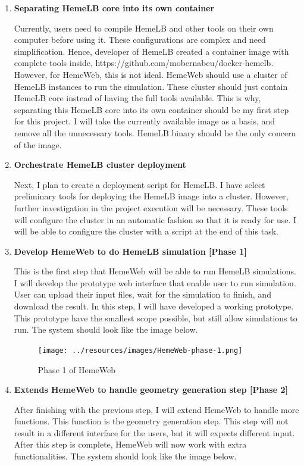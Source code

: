 \documentclass[]{article}
\begin{document}
\begin{enumerate}
\def\labelenumi{\arabic{enumi}.}
\item
  \textbf{Separating HemeLB core into its own container}

  Currently, users need to compile HemeLB and other tools on their own
  computer before using it. These configurations are complex and need
  simplification. Hence, developer of HemeLB created a container image
  with complete tools inside,
  https://github.com/mobernabeu/docker-hemelb. However, for HemeWeb,
  this is not ideal. HemeWeb should use a cluster of HemeLB instances to
  run the simulation. These cluster should just contain HemeLB core
  instead of having the full tools available. This is why, separating
  this HemeLB core into its own container should be my first step for
  this project. I will take the currently available image as a basis,
  and remove all the unnecessary tools. HemeLB binary should be the only
  concern of the image.
\item
  \textbf{Orchestrate HemeLB cluster deployment}

  Next, I plan to create a deployment script for HemeLB. I have select
  preliminary tools for deploying the HemeLB image into a cluster.
  However, further investigation in the project execution will be
  necessary. These tools will configure the cluster in an automatic
  fashion so that it is ready for use. I will be able to configure the
  cluster with a script at the end of this task.
\item
  \textbf{Develop HemeWeb to do HemeLB simulation {[}Phase 1{]}}

  This is the first step that HemeWeb will be able to run HemeLB
  simulations. I will develop the prototype web interface that enable
  user to run simulation. User can upload their input files, wait for
  the simulation to finish, and download the result. In this step, I
  will have developed a working prototype. This prototype have the
  smallest scope possible, but still allow simulations to run. The
  system should look like the image below.

  \begin{figure}[H]
  \centering
  \texttt{[image: ../resources/images/HemeWeb-phase-1.png]}
  \caption{Phase 1 of HemeWeb}
  \end{figure}
\item
  \textbf{Extends HemeWeb to handle geometry generation step {[}Phase
  2{]}}

  After finishing with the previous step, I will extend HemeWeb to
  handle more functions. This function is the geometry generation step.
  This step will not result in a different interface for the users, but
  it will expects different input. After this step is complete, HemeWeb
  will now work with extra functionalities. The system should look like
  the image below.


\end{enumerate}
\end{document}
